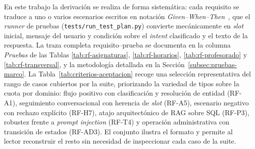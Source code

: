 En este trabajo la derivación se realiza de forma sistemática: cada requisito se traduce a uno o varios escenarios escritos en notación \textit{Given--When--Then}~\cite{north2006bdd}, que el \textit{runner} de pruebas (\texttt{tests/run\_test\_plan.py}) convierte mecánicamente en \textit{slot} inicial, mensaje del usuario y condición sobre el \textit{intent} clasificado y el texto de la respuesta. La traza completa requisito--prueba se documenta en la columna \textit{Pruebas} de las Tablas \ref{tab:rf-asignaturas}, \ref{tab:rf-horarios}, \ref{tab:rf-profesorado} y \ref{tab:rf-transversal}, y la metodología detallada en la Sección~\ref{subsec:pruebas-marco}. La Tabla~\ref{tab:criterios-aceptacion} recoge una selección representativa del rango de casos cubiertos por la suite, priorizando la variedad de tipos sobre la cuota por dominio: flujo positivo con clasificación y resolución de entidad (RF-A1), seguimiento conversacional con herencia de \textit{slot} (RF-A5), escenario negativo con rechazo explícito (RF-H7), atajo arquitectónico de RAG sobre SQL (RF-P3), robustez frente a \textit{prompt injection} (RF-T4) y operación administrativa con transición de estados (RF-AD3). El conjunto ilustra el formato y permite al lector reconstruir el resto sin necesidad de inspeccionar cada caso de la suite.

